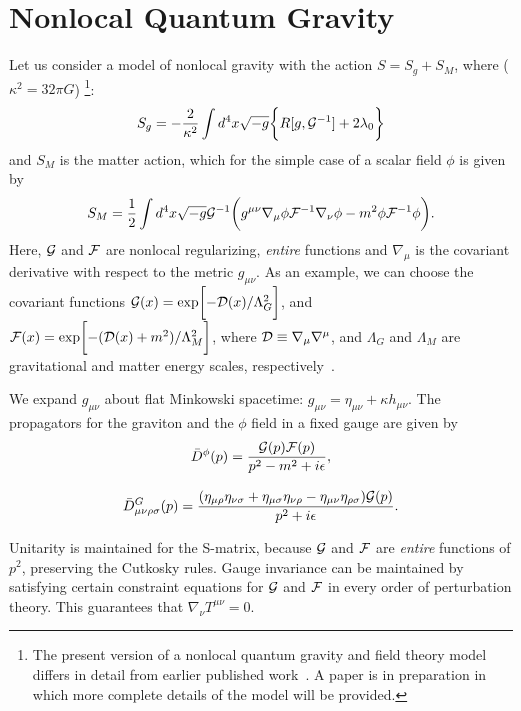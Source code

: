 \documentclass[a4paper,11pt]{article}
\begin{document}
\section{\bf Nonlocal Quantum Gravity}

Let us consider a model of nonlocal gravity with the action
$S=S_g+S_M$, where ($\kappa^2=32\pi G$)
\footnote{The present version of a nonlocal quantum gravity and
field theory model differs in detail from
earlier published work~\cite{Moffat,Moffat2}. A paper is in preparation in which more complete
details of the model will be provided.}:
\begin{equation}
S_g=-\frac{2}{\kappa^2}\int d^4x\sqrt{-g}\biggl\{R[g,{\cal
G}^{-1}]+2\lambda_0\biggr\}
\end{equation}
and $S_M$ is the matter action, which for the simple case of
a scalar field $\phi$ is given by
\begin{equation}
S_M=\frac{1}{2}\int d^4x\sqrt{-g}{\cal
G}^{-1}\biggl(g^{\mu\nu}\nabla_\mu\phi{\cal F}^{-1}\nabla_\nu\phi
-m^2\phi{\cal F}^{-1}\phi\biggr).
\end{equation}
Here, ${\cal G}$ and ${\cal F}$ are nonlocal regularizing,
{\it entire} functions and $\nabla_\mu$ is the covariant
derivative with respect to the metric $g_{\mu\nu}$. As an example,
we can choose the covariant
functions
${\cal G}(x)=\exp\biggl[-{\cal D}(x)/\Lambda_G^2\biggr]$,
and
${\cal F}(x)=\exp\biggl[-({\cal D}(x)+m^2)/\Lambda_M^2\biggr]$,
where ${\cal D}\equiv\nabla_\mu\nabla^\mu$, and $\Lambda_G$ and
$\Lambda_M$ are gravitational and matter energy scales,
respectively~\cite{Moffat,Moffat2}.

We expand $g_{\mu\nu}$ about flat Minkowski spacetime:
$g_{\mu\nu}=\eta_{\mu\nu}+\kappa h_{\mu\nu}$. The propagators for the
graviton and the $\phi$ field in a fixed gauge are given by
\begin{equation}
{\bar D}^\phi(p)=\frac{{\cal G}(p){\cal F}(p)}{p^2-m^2+i\epsilon},
\end{equation}
$$ $$
\begin{equation}
{\bar D}^G_{\mu\nu\rho\sigma}(p)=\frac{(\eta_{\mu\rho}\eta_{\nu\sigma}
+\eta_{\mu\sigma}\eta_{\nu\rho}-\eta_{\mu\nu}\eta_{\rho\sigma})
{\cal G}(p)}{p^2+i\epsilon}.
\end{equation}

Unitarity is maintained for the S-matrix, because ${\cal G}$ and
${\cal F}$ are {\it entire} functions of $p^2$, preserving the Cutkosky
rules. Gauge invariance can be maintained by satisfying certain
constraint equations for ${\cal G}$ and ${\cal F}$ in every order of
perturbation theory.  This guarantees that $\nabla_\nu T^{\mu\nu}=0$.
\end{document}
